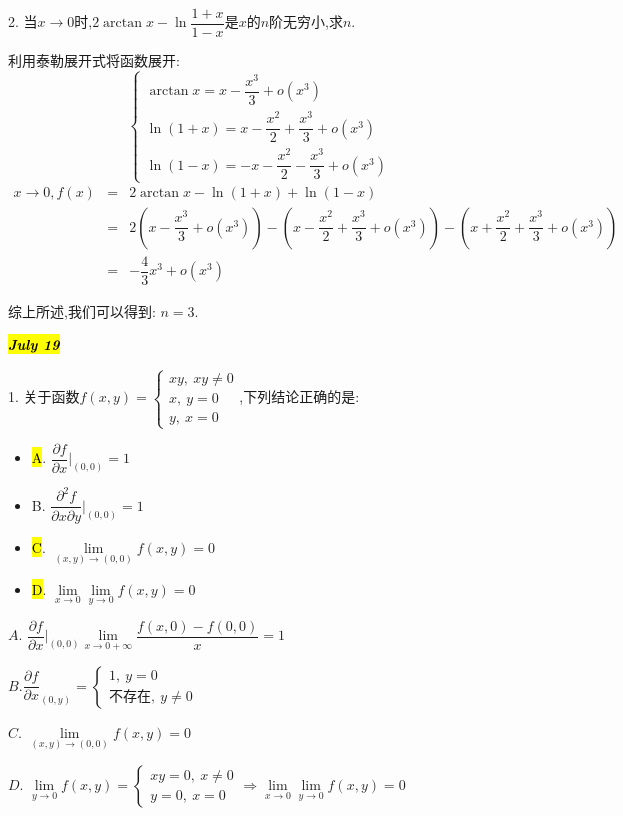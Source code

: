 2. 当$x\rightarrow 0$时,$2\arctan x-\ln\dfrac{1+x}{1-x}$是$x$的$n$阶无穷小,求$n$.
\begin{solution}
	
	利用泰勒展开式将函数展开: 
	$$\left\lbrace
	\begin{array}{l}
		\arctan x=x-\dfrac{x^3}{3}+o(x^3)\\
		\ln(1+x)=x-\dfrac{x^2}{2}+\dfrac{x^3}{3}+o(x^3)\\
		\ln(1-x)=-x-\dfrac{x^2}{2}-\dfrac{x^3}{3}+o(x^3)
	\end{array}
	\right. $$
	\begin{eqnarray*}
		x\rightarrow 0, f(x)&=&2\arctan x-\ln(1+x)+\ln(1-x)\\
		&=&2(x-\dfrac{x^3}{3}+o(x^3))-(x-\dfrac{x^2}{2}+\dfrac{x^3}{3}+o(x^3))-(x+\dfrac{x^2}{2}+\dfrac{x^3}{3}+o(x^3))\\
		&=&-\dfrac{4}{3}x^3+o(x^3)
	\end{eqnarray*}
	
	综上所述,我们可以得到: $n=3$.
\end{solution}

\hl{\textbf{\textit{July 19}}}

1. 关于函数$f(x,y)=\left\lbrace
\begin{array}{l}
	xy,\ xy\neq 0\\x,\ y=0\\y,\ x=0
\end{array}
\right. $,下列结论正确的是: 
\begin{itemize}
	\item \hl{A}. $\dfrac{\partial f}{\partial x}|_{(0,0)}=1$
	\item B. $\dfrac{\partial^2 f}{\partial x\partial y}|_{(0,0)}=1$
	\item \hl{C}. $\lim\limits_{(x,y)\rightarrow (0,0)}f(x,y)=0$
	\item \hl{D}. $\lim\limits_{x\rightarrow 0}\lim\limits_{y\rightarrow 0}f(x,y)=0$
\end{itemize}
\begin{solution}
	
	$A$. $\dfrac{\partial f}{\partial x}|_{(0,0)}\lim\limits_{x\rightarrow 0 +\infty}\dfrac{f(x,0)-f(0,0)}{x}=1$
	
	$B$.$\dfrac{\partial f}{\partial x}_{(0,y)}=\left\lbrace
	\begin{array}{l}
		1,\ y=0\\ \text{不存在},\ y\neq 0 
	\end{array}
	\right. $
	
	$C$. $\lim\limits_{(x,y)\rightarrow (0,0)}f(x,y)=0$
	
	$D$. $\lim\limits_{y\rightarrow 0}f(x,y)=\left\lbrace
	\begin{array}{l}
		xy=0,\ x\neq 0\\y=0,\ x=0
	\end{array}
	\right.\Rightarrow  \lim\limits_{x\rightarrow 0}\lim\limits_{y\rightarrow 0}f(x,y)=0$
\end{solution}

